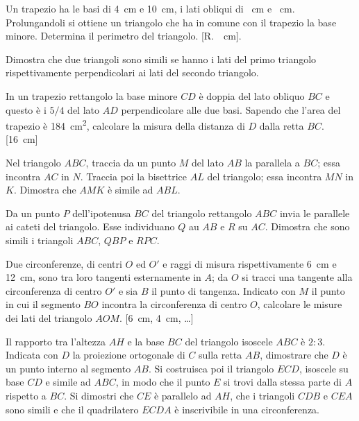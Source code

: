 \begin{multicols}{2}
\begin{esercizio}
\label{ese:6.67}
Un trapezio ha le basi di 4~cm e 10~cm, i lati obliqui di ~cm e ~cm. Prolungandoli si ottiene un triangolo che ha in comune con il trapezio la base minore. Determina il perimetro del triangolo. [R.~~cm].
\end{esercizio}

\begin{esercizio}
\label{ese:6.68}
Dimostra che due triangoli sono simili se hanno i lati del primo triangolo rispettivamente perpendicolari ai lati del secondo triangolo. 
\end{esercizio}

\begin{esercizio}
\label{ese:6.69}
In un trapezio rettangolo la base minore $CD$ è doppia del lato obliquo $BC$ e questo è i $5/4$ del lato $AD$ perpendicolare alle due basi. Sapendo che l'area del trapezio è 184~cm\textsuperscript{2}, calcolare la misura della distanza di $D$ dalla retta $BC$. [16~cm] 
\end{esercizio}

\begin{esercizio}
\label{ese:6.70}
Nel triangolo $ABC$, traccia da un punto $M$ del lato $AB$ la parallela a $BC$; essa incontra $AC$ in $N$. Traccia poi la bisettrice $AL$ del triangolo; essa incontra $MN$ in $K$. Dimostra che $AMK$ è simile ad $ABL$.
\end{esercizio}

\begin{esercizio}
\label{ese:6.71}
Da un punto $P$ dell'ipotenusa $BC$ del triangolo rettangolo $ABC$ invia le parallele ai cateti del triangolo. Esse individuano $Q$ au $AB$ e $R$ su $AC$. Dimostra che sono simili i triangoli $ABC$, $QBP$ e $RPC$.
\end{esercizio}

\begin{esercizio}
\label{ese:6.72}
Due circonferenze, di centri $O$ ed $O'$ e raggi di misura rispettivamente 6~cm e 12~cm, sono tra loro tangenti esternamente in $A$; da $O$ si tracci una tangente alla circonferenza di centro $O'$ e sia $B$ il punto di tangenza. Indicato con $M$ il punto in cui il segmento $BO$ incontra la circonferenza di centro $O$, calcolare le misure dei lati del triangolo $AOM$. [6~cm, 4~cm, \ldots{}]
\end{esercizio}

\begin{esercizio}
\label{ese:6.73}
Il rapporto tra l'altezza $AH$ e la base $BC$ del triangolo isoscele $ABC$ è $2:3$. Indicata con $D$ la proiezione ortogonale di $C$ sulla retta $AB$, dimostrare che $D$ è un punto interno al segmento $AB$. Si costruisca poi il triangolo $ECD$, isoscele su base $CD$ e simile ad $ABC$, in modo che il punto $E$ si trovi dalla stessa parte di $A$ rispetto a $BC$. Si dimostri che $CE$ è parallelo ad $AH$, che i triangoli $CDB$ e $CEA$ sono simili e che il quadrilatero $ECDA$ è inscrivibile in una circonferenza.
\end{esercizio}


\end{multicols}
